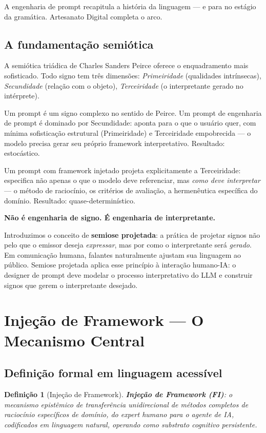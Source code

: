 \documentclass[12pt,a4paper]{article}
\newtheorem{definition}{Definição}[section]
\begin{document}
A engenharia de prompt recapitula a história da linguagem --- e para no estágio da gramática. Artesanato Digital completa o arco.

\subsection{A fundamentação semiótica}

A semiótica triádica de Charles Sanders Peirce oferece o enquadramento mais sofisticado. Todo signo tem três dimensões: \emph{Primeiridade} (qualidades intrínsecas), \emph{Secundidade} (relação com o objeto), \emph{Terceiridade} (o interpretante gerado no intérprete).

Um prompt é um signo complexo no sentido de Peirce. Um prompt de engenharia de prompt é dominado por Secundidade: aponta para o que o usuário quer, com mínima sofisticação estrutural (Primeiridade) e Terceiridade empobrecida --- o modelo precisa gerar seu próprio framework interpretativo. Resultado: estocástico.

Um prompt com framework injetado projeta explicitamente a Terceiridade: especifica não apenas o que o modelo deve referenciar, mas \emph{como deve interpretar} --- o método de raciocínio, os critérios de avaliação, a hermenêutica específica do domínio. Resultado: quase-determinístico.

\textbf{Não é engenharia de signo. É engenharia de interpretante.}

Introduzimos o conceito de \textbf{semiose projetada}: a prática de projetar signos não pelo que o emissor deseja \emph{expressar}, mas por como o interpretante será \emph{gerado}. Em comunicação humana, falantes naturalmente ajustam sua linguagem ao público. Semiose projetada aplica esse princípio à interação humano-IA: o designer de prompt deve modelar o processo interpretativo do LLM e construir signos que gerem o interpretante desejado.

\section{Injeção de Framework --- O Mecanismo Central}
\label{sec:fi}

\subsection{Definição formal em linguagem acessível}

\begin{definition}[Injeção de Framework]
\textbf{Injeção de Framework (FI)}: o mecanismo epistêmico de transferência unidirecional de métodos completos de raciocínio específicos de domínio, do expert humano para o agente de IA, codificados em linguagem natural, operando como substrato cognitivo persistente.
\end{definition}
\end{document}
